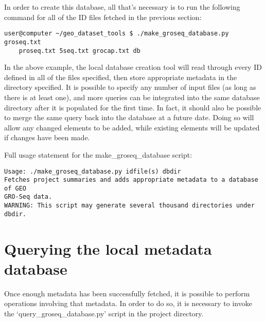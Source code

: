 \documentclass[12pt,letterpaper]{article}
\begin{document}
In order to create this database, all that's necessary is to run the following command for all of the ID files fetched in the previous section:
\begin{verbatim}
user@computer ~/geo_dataset_tools $ ./make_groseq_database.py groseq.txt 
    proseq.txt 5seq.txt grocap.txt db
\end{verbatim}


In the above example, the local database creation tool will read through every ID defined in all of the files specified, then store appropriate metadata in
the directory specified. It is possible to specify any number of input files (as long as there is at least one), and more queries can be integrated into the
same database directory after it is populated for the first time. In fact, it should also be possible to merge the same query back into the database at a future
date. Doing so will allow any changed elements to be added, while existing elements will be updated if changes have been made.

Full usage statement for the make\_groseq\_database script:
\begin{verbatim}
Usage: ./make_groseq_database.py idfile(s) dbdir
Fetches project summaries and adds appropriate metadata to a database of GEO 
GRO-Seq data.
WARNING: This script may generate several thousand directories under dbdir.
\end{verbatim}

\section{Querying the local metadata database}
Once enough metadata has been successfully fetched, it is possible to perform operations involving that metadata.
In order to do so, it is necessary to invoke the `query\_groseq\_database.py' script in the project directory.
\end{document}
